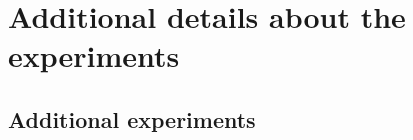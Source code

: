 \documentclass{article}
\def\mass{\mathrm{M}}
\def\transfo{\operatorname{T}}
\def\eqsp{\,}
\def\eqsp{\;}
\newcommand{\1}{\mathds{1}}
\def\rme{\mathrm{e}}
\begin{document}
\section{Additional details about the experiments}
\subsection{Additional experiments}
\end{document}
